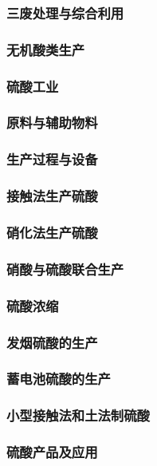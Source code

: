 \documentclass[UTF8]{../../ApplicationUniverse}
\begin{document}
    \subsubsection{三废处理与综合利用}
\subsubsection{无机酸类生产}
    \subsubsection{硫酸工业}
        \subsubsection{原料与辅助物料}
        \subsubsection{生产过程与设备}
            \subsubsection{接触法生产硫酸}
            \subsubsection{硝化法生产硫酸}
            \subsubsection{硝酸与硫酸联合生产}
            \subsubsection{硫酸浓缩}
            \subsubsection{发烟硫酸的生产}
            \subsubsection{蓄电池硫酸的生产}
            \subsubsection{小型接触法和土法制硫酸}
        \subsubsection{硫酸产品及应用}
\end{document}
